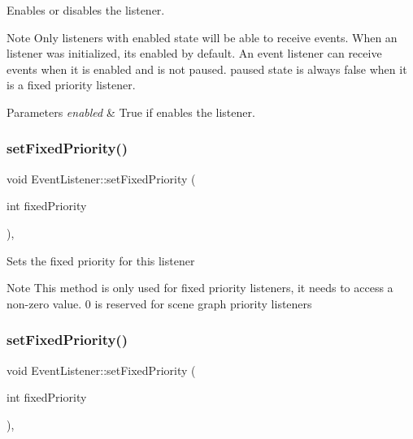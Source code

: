 Enables or disables the listener. \begin{DoxyNote}{Note}
Only listeners with {\ttfamily enabled} state will be able to receive events. When an listener was initialized, it\textquotesingle{}s enabled by default. An event listener can receive events when it is enabled and is not paused. paused state is always false when it is a fixed priority listener.
\end{DoxyNote}

\begin{DoxyParams}{Parameters}
{\em enabled} & True if enables the listener. \\
\hline
\end{DoxyParams}
\mbox{\label{classEventListener_a01a0f3888940db868f7428094e19fe4a}} 
\subsubsection{\texorpdfstring{set\+Fixed\+Priority()}{setFixedPriority()}\hspace{0.1cm}{\footnotesize\ttfamily [1/2]}}
{\footnotesize\ttfamily void Event\+Listener\+::set\+Fixed\+Priority (\begin{DoxyParamCaption}\item[{int}]{fixed\+Priority }\end{DoxyParamCaption})\hspace{0.3cm}{\ttfamily [inline]}, {\ttfamily [protected]}}

Sets the fixed priority for this listener \begin{DoxyNote}{Note}
This method is only used for {\ttfamily fixed priority listeners}, it needs to access a non-\/zero value. 0 is reserved for scene graph priority listeners 
\end{DoxyNote}
\mbox{\label{classEventListener_a01a0f3888940db868f7428094e19fe4a}} 
\subsubsection{\texorpdfstring{set\+Fixed\+Priority()}{setFixedPriority()}\hspace{0.1cm}{\footnotesize\ttfamily [2/2]}}
{\footnotesize\ttfamily void Event\+Listener\+::set\+Fixed\+Priority (\begin{DoxyParamCaption}\item[{int}]{fixed\+Priority }\end{DoxyParamCaption})\hspace{0.3cm}{\ttfamily [inline]}, {\ttfamily [protected]}}

